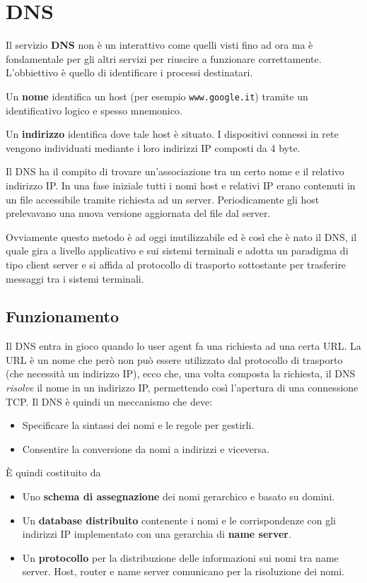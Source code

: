 \section{DNS}
Il servizio \textbf{DNS} non è un interattivo come quelli visti fino ad
ora ma è fondamentale per gli altri servizi per riuscire a funzionare 
correttamente. L'obbiettivo è quello di identificare i processi
destinatari.

Un \textbf{nome} identifica un host (per esempio \verb|www.google.it|) 
tramite un identificativo logico e spesso mnemonico.

Un \textbf{indirizzo} identifica dove tale host è situato. I 
dispositivi connessi in rete vengono individuati mediante i loro 
indirizzi IP composti da 4 byte.

Il DNS ha il compito di trovare un'associazione tra un certo nome e il 
relativo indirizzo IP. In una fase iniziale tutti i nomi host e 
relativi IP erano contenuti in un file accessibile tramite richiesta ad
un server. Periodicamente gli host prelevavano una nuova versione 
aggiornata del file dal server.

Ovviamente questo metodo è ad oggi inutilizzabile ed è così che è nato 
il DNS, il quale gira a livello applicativo e sui sistemi terminali e
adotta un paradigma di tipo client server e si affida al protocollo di 
trasporto sottostante per trasferire messaggi tra i sistemi terminali.

\subsection{Funzionamento}
Il DNS entra in gioco quando lo user agent fa una richiesta ad una 
certa URL. La URL è un nome che però non può essere utilizzato dal 
protocollo di trasporto (che necessità un indirizzo IP), ecco che, una
volta composta la richiesta, il DNS \emph{risolve} il nome in un 
indirizzo IP, permettendo così l'apertura di una connessione TCP. Il
DNS è quindi un meccanismo che deve:
\begin{itemize}
	\item Specificare la sintassi dei nomi e le regole per gestirli.
	\item Consentire la conversione da nomi a indirizzi e viceversa.
\end{itemize}
\`E quindi costituito da
\begin{itemize}
	\item Uno \textbf{schema di assegnazione} dei nomi gerarchico e 
		basato su domini.
	\item Un \textbf{database distribuito} contenente i nomi e le 
		corrispondenze con gli indirizzi IP implementato con una 
		gerarchia di \textbf{name server}.
	\item Un \textbf{protocollo} per la distribuzione delle 
		informazioni sui nomi tra name server. Host, router e name 
		server comunicano per la risoluzione dei nomi.
\end{itemize}

